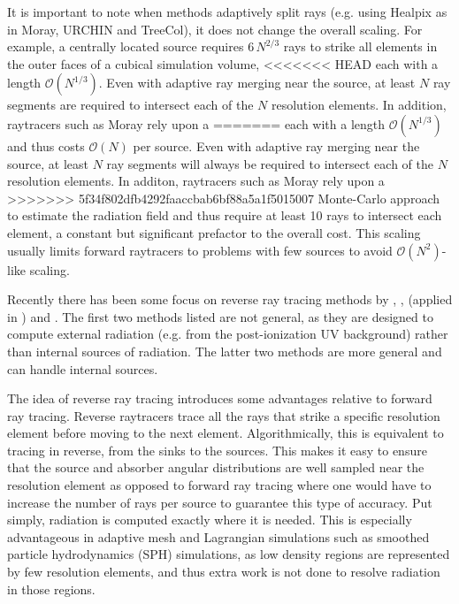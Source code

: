 \documentclass[fleq,usenatbib]{mnras}
\newcommand{\bigO}[1]{\mathcal{O}\left(#1\right)}
\begin{document}
It is important to note when methods adaptively split rays (e.g. using Healpix 
\citealt{gorskiEt05} as in Moray, URCHIN and TreeCol), it does not change the 
overall scaling.  For example, a centrally located source requires $6\, N^{2/3}$ 
rays to strike all elements in the outer faces of a cubical simulation volume, 
<<<<<<< HEAD
each with a length $\bigO{N^{1/3}}$. Even with adaptive ray merging near the 
source, at least $N$ ray segments are required to intersect each of the $N$ 
resolution elements. In addition, raytracers such as Moray rely upon a 
=======
each with a length $\bigO{N^{1/3}}$ and thus costs $\bigO{N}$ per source. Even with adaptive ray merging near the 
source, at least $N$ ray segments will always be required to intersect each of the $N$ 
resolution elements. In additon, raytracers such as Moray rely upon a 
>>>>>>> 5f34f802dfb4292faaccbab6bf88a5a1f5015007
Monte-Carlo approach to estimate the radiation field and thus require at least 
10 rays to intersect each element, a constant but significant prefactor to the 
overall cost. This scaling usually limits forward raytracers to problems with 
few sources to avoid $\mathcal{O}(N^2)$-like scaling. 

Recently there has been some focus on reverse ray tracing methods by
\cite{clarkEt12}, \cite{altayTheuns13}, \cite{Woods2015} (applied in 
\citealt{KannanEt14}) and \cite{HaidEt18}. The first two methods listed are 
not general, as they are designed to compute external radiation (e.g. from the 
post-ionization UV background) rather than internal sources of radiation.
The latter two methods are more general and can handle internal sources.

The idea of reverse ray tracing introduces some advantages relative 
to forward ray tracing.  Reverse raytracers trace all the rays that strike
a specific resolution element before moving to the next element.
Algorithmically, this is equivalent to tracing in reverse, from the sinks to 
the sources. This makes it easy to ensure that the source and absorber angular 
distributions are well sampled near the resolution element as opposed to 
forward ray tracing where one would have to increase the number of rays per 
source to guarantee this type of accuracy. Put simply, radiation is computed 
exactly where it is needed.  This is especially advantageous in adaptive mesh 
and Lagrangian simulations such as smoothed particle hydrodynamics (SPH) 
simulations, as low density regions are represented by few resolution 
elements, and thus extra work is not done to resolve radiation in those 
regions.
\end{document}
